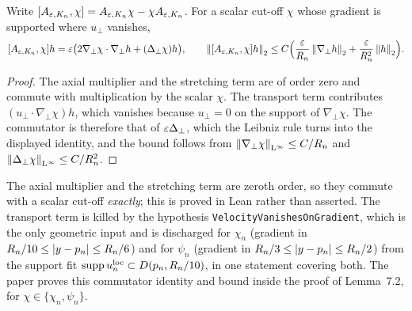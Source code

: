 \begin{lemma}
  \label{lem:transfer:commutator}
  \leanok
  Write $[A_{\varepsilon,K_n},\chi]=A_{\varepsilon,K_n}\chi-\chi A_{\varepsilon,K_n}$.  For a scalar cut-off $\chi$
  whose gradient is supported where $u_\perp$ vanishes,
  \[
    [A_{\varepsilon,K_n},\chi]h
      =\varepsilon\bigl(2\nabla_\perp\chi\cdot\nabla_\perp h+(\Delta_\perp\chi)h\bigr),
    \qquad
    \left\|[A_{\varepsilon,K_n},\chi]h\right\|_2\leq C\Bigl(\frac{\varepsilon}{R_n}\left\|\nabla_\perp h\right\|_2
      +\frac{\varepsilon}{R_n^2}\left\|h\right\|_2\Bigr).
  \]
\end{lemma}

\begin{proof}
  \leanok
  The axial multiplier and the stretching term are of order zero and commute with
  multiplication by the scalar $\chi$.  The transport term contributes
  $(u_\perp\cdot\nabla_\perp\chi)h$, which vanishes because $u_\perp=0$ on the support of
  $\nabla_\perp\chi$.  The commutator is therefore that of $\varepsilon\Delta_\perp$, which the
  Leibniz rule turns into the displayed identity, and the bound follows from
  $\left\|\nabla_\perp\chi\right\|_{\mathrm{L}^\infty}\leq C/R_n$ and
  $\left\|\Delta_\perp\chi\right\|_{\mathrm{L}^\infty}\leq C/R_n^2$.
\end{proof}

The axial multiplier and the stretching term are zeroth order, so they commute with a
scalar cut-off \emph{exactly}; this is proved in Lean rather than asserted.  The transport
term is killed by the hypothesis \texttt{VelocityVanishesOnGradient}, which is the only
geometric input and is discharged for $\chi_n$ (gradient in $R_n/10\leq\left\lvert y-p_n\right\rvert\leq
R_n/6$) and for $\psi_n$ (gradient in $R_n/3\leq\left\lvert y-p_n\right\rvert\leq R_n/2$) from the support
fit $\operatorname{supp} u_n^{\rm loc}\subset D(p_n,R_n/10)$, in one statement covering both.  The paper
proves this commutator identity and bound inside the proof of Lemma~7.2, for
$\chi\in\{\chi_n,\psi_n\}$.

